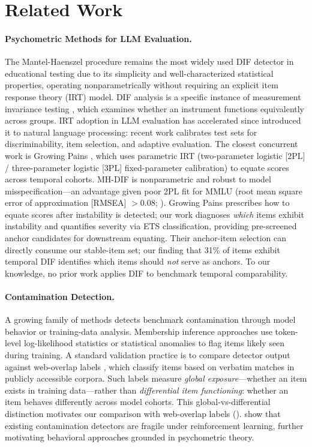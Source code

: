 \section{Related Work}
\label{sec:related_work}

\paragraph{Psychometric Methods for LLM Evaluation.}
The Mantel-Haenszel procedure \citep{holland1988mh} remains the most widely used DIF detector in educational testing due to its simplicity and well-characterized statistical properties, operating nonparametrically without requiring an explicit item response theory (IRT) model. DIF analysis is a specific instance of measurement invariance testing \citep{meredith1993invariance}, which examines whether an instrument functions equivalently across groups. IRT adoption in LLM evaluation has accelerated since \citet{lalor2019irt} introduced it to natural language processing: recent work calibrates test sets for discriminability, item selection, and adaptive evaluation. The closest concurrent work is Growing Pains \citep{habba2026growingpains}, which uses parametric IRT (two-parameter logistic [2PL] / three-parameter logistic [3PL] fixed-parameter calibration) to equate scores across temporal cohorts. MH-DIF is nonparametric and robust to model misspecification---an advantage given poor 2PL fit for MMLU (root mean square error of approximation [RMSEA] $> 0.08$; ). Growing Pains prescribes how to equate scores after instability is detected; our work diagnoses \emph{which} items exhibit instability and quantifies severity via ETS classification, providing pre-screened anchor candidates for downstream equating. Their anchor-item selection can directly consume our stable-item set; our finding that 31\% of items exhibit temporal DIF identifies which items should \emph{not} serve as anchors. To our knowledge, no prior work applies DIF to benchmark temporal comparability.

\paragraph{Contamination Detection.}
A growing family of methods detects benchmark contamination through model behavior or training-data analysis. Membership inference approaches use token-level log-likelihood statistics \citep{shi2024mink} or statistical anomalies \citep{dekoninck2024constat} to flag items likely seen during training. A standard validation practice is to compare detector output against web-overlap labels \citep{li2024contamination}, which classify items based on verbatim matches in publicly accessible corpora. Such labels measure \emph{global exposure}---whether an item exists in training data---rather than \emph{differential item functioning}: whether an item behaves differently across model cohorts. This global-vs-differential distinction motivates our comparison with web-overlap labels (). \citet{wang2026fragility} show that existing contamination detectors are fragile under reinforcement learning, further motivating behavioral approaches grounded in psychometric theory.

